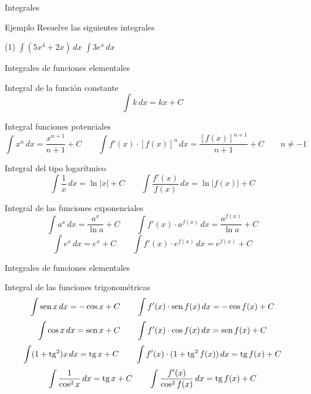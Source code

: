 \documentclass[8pt]{beamer}
\begin{document}
\begin{frame}[t]{Integrales}
\begin{exampleblock}{Ejemplo}
Resuelve las siguientes integrales
\begin{tasks}[label=\alph*)](1)
\task $\displaystyle \int \left( 5x^4 + 2x \right)\, dx$
\task $\displaystyle \int 3e^x \, dx$
\end{tasks}
\end{exampleblock}

\end{frame}

\begin{frame}[t]{Integrales de funciones elementales}
\begin{alertblock}{Integral de la función constante}
\[ \int k \, dx = kx+C \]
\end{alertblock}
\pause

\begin{alertblock}{Integral funciones potenciales}
\[ \int x^n \, dx = \dfrac{x^{n+1}}{n+1}+C \qquad \int f'(x)\cdot \left[f(x)\right]^n \, dx = \dfrac{\left[f(x)\right]^{n+1}}{n+1}+C \qquad n \neq -1  \]
\end{alertblock}
\pause
\begin{alertblock}{Integral del tipo logarítmico}
\[ \int \dfrac{1}{x} \, dx = \ln |x|+C \qquad \int \dfrac{f'(x)}{f(x)}\, dx = \ln | f(x) | +C   \]
\end{alertblock}
\pause
\begin{alertblock}{Integral de las funciones exponenciales}
\[ \int a^x \, dx = \dfrac{a^x}{\ln a} +C \qquad \int f'(x)\cdot a^{f(x)}\, dx = \dfrac{a^{f(x)}}{\ln a} +C   \]
\[ \int e^{x} \, dx = e^x+C \qquad \int f'(x)\cdot e^{f(x)}\, dx = e^{f(x)} +C   \]
\end{alertblock}
\end{frame}
\begin{frame}[t]{Integrales de funciones elementales}
\begin{alertblock}{Integral de las funciones trigonométricas}
\[ \int \mathop{\rm sen}\nolimits x \, dx = -\cos x + C \qquad \int f'(x) \cdot \mathop{\rm sen}\nolimits f(x) \, dx = -\cos f(x) +C \]
\pause
\[ \int \cos x \, dx = \mathop{\rm sen}\nolimits x + C \qquad \int f'(x) \cdot \cos f(x) \, dx = \mathop{\rm sen}\nolimits f(x) +C \]
\pause
\[ \int (1+\mathop{\rm tg}\nolimits^2) x \, dx = \mathop{\rm tg}\nolimits x + C \qquad \int f'(x) \cdot (1+\mathop{\rm tg}\nolimits^2 f(x)) \, dx = \mathop{\rm tg}\nolimits f(x) +C \]
\pause
\[ \int \dfrac{1}{\cos^2 x} \, dx = \mathop{\rm tg}\nolimits x + C \qquad \int \dfrac{f'(x)}{\cos^2 f(x)} \, dx = \mathop{\rm tg}\nolimits f(x) +C \]
\end{alertblock}
\end{frame}
\end{document}
